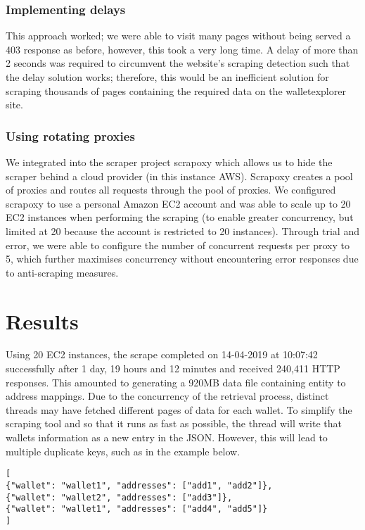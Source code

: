 \subsubsection{Implementing delays} 
This approach worked; we were able to visit many pages without being served a 403 response as before, however, this took a very long time. A delay of more than 2 seconds was required to circumvent the website's scraping detection such that the delay solution works; therefore, this would be an inefficient solution for scraping thousands of pages containing the required data on the walletexplorer site. 

\subsubsection{Using rotating proxies}
We integrated into the scraper project scrapoxy which allows us to hide the scraper behind a cloud provider (in this instance AWS). Scrapoxy creates a pool of proxies and routes all requests through the pool of proxies. We configured scrapoxy to use a personal Amazon EC2 account and was able to scale up to 20 EC2 instances when performing the scraping (to enable greater concurrency, but limited at 20 because the account is restricted to 20 instances).  Through trial and error, we were able to configure the number of concurrent requests per proxy to 5, which further maximises concurrency without encountering error responses due to anti-scraping measures. 

\section{Results}
Using 20 EC2 instances, the scrape completed on 14-04-2019 at 10:07:42 successfully after 1 day, 19 hours and 12 minutes and received 240,411 HTTP responses. This amounted to generating a 920MB data file containing entity to address mappings. Due to the concurrency of the retrieval process, distinct threads may have fetched different pages of data for each wallet. To simplify the scraping tool and so that it runs as fast as possible, the thread will write that wallets information as a new entry in the JSON. However, this will lead to multiple duplicate keys, such as in the example below. 
\begin{lstlisting}
[
{"wallet": "wallet1", "addresses": ["add1", "add2"]},
{"wallet": "wallet2", "addresses": ["add3"]},
{"wallet": "wallet1", "addresses": ["add4", "add5"]}
]
\end{lstlisting}

